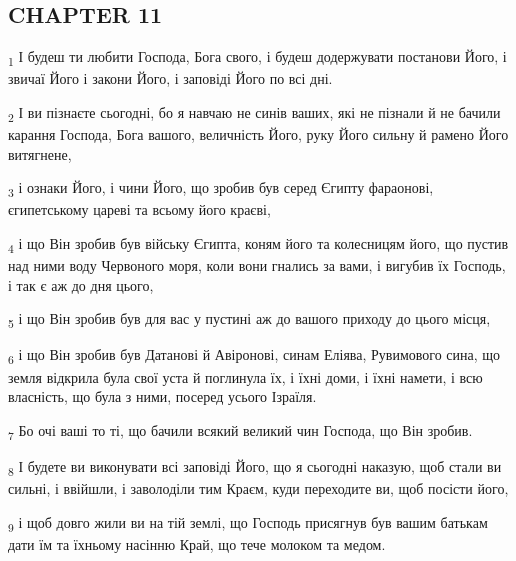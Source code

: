 \subsection{CHAPTER 11}
\begin{tcolorbox}
\textsubscript{1} І будеш ти любити Господа, Бога свого, і будеш додержувати постанови Його, і звичаї Його і закони Його, і заповіді Його по всі дні.
\end{tcolorbox}
\begin{tcolorbox}
\textsubscript{2} І ви пізнаєте сьогодні, бо я навчаю не синів ваших, які не пізнали й не бачили карання Господа, Бога вашого, величність Його, руку Його сильну й рамено Його витягнене,
\end{tcolorbox}
\begin{tcolorbox}
\textsubscript{3} і ознаки Його, і чини Його, що зробив був серед Єгипту фараонові, єгипетському цареві та всьому його краєві,
\end{tcolorbox}
\begin{tcolorbox}
\textsubscript{4} і що Він зробив був війську Єгипта, коням його та колесницям його, що пустив над ними воду Червоного моря, коли вони гнались за вами, і вигубив їх Господь, і так є аж до дня цього,
\end{tcolorbox}
\begin{tcolorbox}
\textsubscript{5} і що Він зробив був для вас у пустині аж до вашого приходу до цього місця,
\end{tcolorbox}
\begin{tcolorbox}
\textsubscript{6} і що Він зробив був Датанові й Авіронові, синам Еліява, Рувимового сина, що земля відкрила була свої уста й поглинула їх, і їхні доми, і їхні намети, і всю власність, що була з ними, посеред усього Ізраїля.
\end{tcolorbox}
\begin{tcolorbox}
\textsubscript{7} Бо очі ваші то ті, що бачили всякий великий чин Господа, що Він зробив.
\end{tcolorbox}
\begin{tcolorbox}
\textsubscript{8} І будете ви виконувати всі заповіді Його, що я сьогодні наказую, щоб стали ви сильні, і ввійшли, і заволоділи тим Краєм, куди переходите ви, щоб посісти його,
\end{tcolorbox}
\begin{tcolorbox}
\textsubscript{9} і щоб довго жили ви на тій землі, що Господь присягнув був вашим батькам дати їм та їхньому насінню Край, що тече молоком та медом.
\end{tcolorbox}
